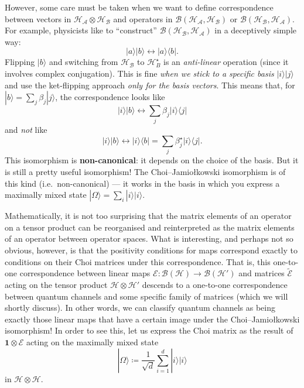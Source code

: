 \documentclass[fleqn]{article}
\newenvironment{technical}{\noindent}{\medskip}
\begin{document}
\begin{technical}
However, some care must be taken when we want to define correspondence between vectors in \(\mathcal{H}_{\mathcal{A}}\otimes\mathcal{H}_{\mathcal{B}}\) and operators in \(\mathscr{B}(\mathcal{H}_{\mathcal{A}},\mathcal{H}_{\mathcal{B}})\) or \(\mathscr{B}(\mathcal{H}_{\mathcal{B}},\mathcal{H}_{\mathcal{A}})\).
For example, physicists like to ``construct'' \(\mathscr{B}(\mathcal{H}_{\mathcal{B}},\mathcal{H}_{\mathcal{A}})\) in a deceptively simple way:
\[
  |a\rangle|b\rangle \longleftrightarrow |a\rangle\langle b|.
\]
Flipping \(|b\rangle\) and switching from \(\mathcal{H}_{\mathcal{B}}\) to \(\mathcal{H}^\star_B\) is an \emph{anti-linear} operation (since it involves complex conjugation).
This is fine \emph{when we stick to a specific basis} \(|i\rangle|j\rangle\) and use the ket-flipping approach \emph{only for the basis vectors}.
This means that, for \(|b\rangle=\sum_j\beta_j|j\rangle\), the correspondence looks like
\[
  |i\rangle|b\rangle \longleftrightarrow \sum_j \beta_j |i\rangle\langle j|
\]
and \emph{not} like
\[
  |i\rangle|b\rangle \longleftrightarrow |i\rangle\langle b|
  = \sum_j \beta^\star_j |i\rangle\langle j|.
\]
This isomorphism is \textbf{non-canonical}: it depends on the choice of the basis.
But it is still a pretty useful isomorphism!
The Choi--Jamiołkowski isomorphism is of this kind (i.e.~non-canonical) --- it works in the basis in which you express a maximally mixed state \(|\Omega\rangle=\sum_i|i\rangle|i\rangle\).

\end{technical}

Mathematically, it is not too surprising that the matrix elements of an operator on a tensor product can be reorganised and reinterpreted as the matrix elements of an operator between operator spaces.
What is interesting, and perhaps not so obvious, however, is that the positivity conditions for maps correspond exactly to conditions on their Choi matrices under this correspondence.
That is, this one-to-one correspondence between linear maps \(\mathcal{E}\colon\mathcal{B}(\mathcal{H})\to\mathcal{B}(\mathcal{H}')\) and matrices \(\widetilde{\mathcal{E}}\) acting on the tensor product \(\mathcal{H}\otimes\mathcal{H}'\) descends to a one-to-one correspondence between quantum channels and some specific family of matrices (which we will shortly discuss).
In other words, we can classify quantum channels as being exactly those linear maps that have a certain image under the Choi--Jamiołkowski isomorphism!
In order to see this, let us express the Choi matrix as the result of \(\mathbf{1}\otimes\mathcal{E}\) acting on the maximally mixed state
\[
  |\Omega\rangle\coloneqq\frac{1}{\sqrt{d}}\sum_{i=1}^d|i\rangle|i\rangle
\]
in \(\mathcal{H}\otimes\mathcal{H}\).
\end{document}
